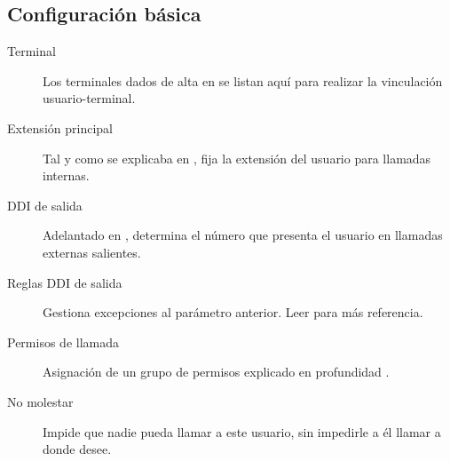 \documentclass[letterpaper,10pt,spanish]{sphinxmanual}
\begin{document}
\subsection{Configuración básica}
\label{pbx_features/users:basic-configuration}
\noindent{}
\begin{description}
\item[{Terminal}] \leavevmode{}\label{pbx_features/users:term-terminal}
Los terminales dados de alta en {\hyperref[pbx_features/terminals:terminals]{}} se listan aquí para realizar la vinculación usuario-terminal.

\item[{Extensión principal}] \leavevmode{}\label{pbx_features/users:term-screen-extension}
Tal y como se explicaba en {\hyperref[pbx_features/extensions:extensions]{}}, fija la extensión del usuario para llamadas internas.

\item[{DDI de salida}] \leavevmode{}\label{pbx_features/users:term-outgoing-ddi}
Adelantado en {\hyperref[external_outgoing_calls/external_ddi:external\string-ddi]{}}, determina el número que presenta el usuario en llamadas externas salientes.

\item[{Reglas DDI de salida}] \leavevmode{}\label{pbx_features/users:term-outgoing-ddi-rules}
Gestiona excepciones al parámetro anterior. Leer {\hyperref[pbx_features/outgoingddi_rules:outgoingddi\string-rules]{}} para más referencia.

\item[{Permisos de llamada}] \leavevmode{}\label{pbx_features/users:term-call-acl}
Asignación de un grupo de permisos explicado en profundidad {\hyperref[pbx_features/call_permissions:call\string-permissions]{}}.

\item[{No molestar}] \leavevmode{}\label{pbx_features/users:term-do-not-disturb}
Impide que nadie pueda llamar a este usuario, sin impedirle a él llamar a donde desee.


\end{description}
\end{document}
